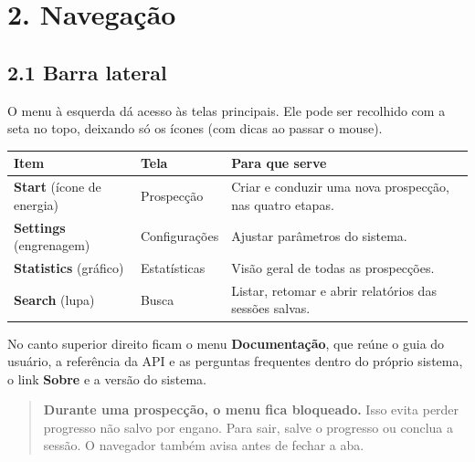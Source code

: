 \documentclass[
  brazilian,
  a4paper,12pt,oneside]{report}
\newcounter{none} %
\begin{document}
\chapter{2. Navegação}\label{navegauxe7uxe3o}

\section{2.1 Barra lateral}\label{barra-lateral}

O menu à esquerda dá acesso às telas principais. Ele pode ser recolhido
com a seta no topo, deixando só os ícones (com dicas ao passar o mouse).

{\def\LTcaptype{none} %
\begin{longtable}[]{@{}
  >{\raggedright\arraybackslash}p{}
  >{\raggedright\arraybackslash}p{}
  >{\raggedright\arraybackslash}p{}@{}}
\toprule\noalign{}
\begin{minipage}[b]{\linewidth}\raggedright
Item
\end{minipage} & \begin{minipage}[b]{\linewidth}\raggedright
Tela
\end{minipage} & \begin{minipage}[b]{\linewidth}\raggedright
Para que serve
\end{minipage} \\
\midrule\noalign{}
\endhead
\bottomrule\noalign{}
\endlastfoot
\textbf{Start} (ícone de energia) & Prospecção & Criar e conduzir uma
nova prospecção, nas quatro etapas. \\
\textbf{Settings} (engrenagem) & Configurações & Ajustar parâmetros do
sistema. \\
\textbf{Statistics} (gráfico) & Estatísticas & Visão geral de todas as
prospecções. \\
\textbf{Search} (lupa) & Busca & Listar, retomar e abrir relatórios das
sessões salvas. \\
\end{longtable}
}

No canto superior direito ficam o menu \textbf{Documentação}, que reúne
o guia do usuário, a referência da API e as perguntas frequentes dentro
do próprio sistema, o link \textbf{Sobre} e a versão do sistema.

\begin{quote}
\textbf{Durante uma prospecção, o menu fica bloqueado.} Isso evita
perder progresso não salvo por engano. Para sair, salve o progresso ou
conclua a sessão. O navegador também avisa antes de fechar a aba.
\end{quote}
\end{document}

